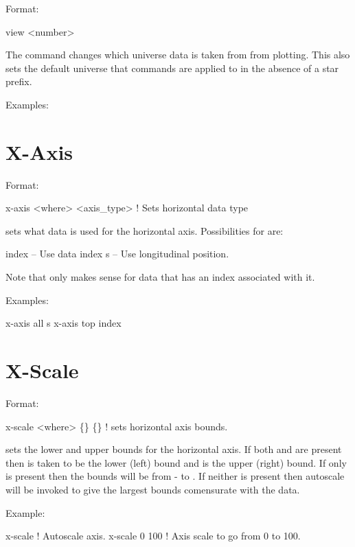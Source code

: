 Format:
\begin{example}
  view <number>
\end{example}

\vskip 0.2in 
The  command changes which universe data is taken from from
plotting.  This also sets the default universe that commands are
applied to in the absence of a star prefix.

Examples:

\section{X-Axis}
\label{s:x-axis}

Format:
\begin{example}
  x-axis <where> <axis_type> ! Sets horizontal data type
\end{example}

\vskip 0.2in 
 sets what data is used for the horizontal
axis. Possibilities for  are:
\begin{example}
  index    -- Use data index
  s        -- Use longitudinal position.
\end{example}
Note that  only makes sense for data that has an index
associated with it.

Examples:
\begin{example}
  x-axis all s
  x-axis top index
\end{example}

\section{X-Scale}
\label{s:x-scale}

Format:
\begin{example}
  x-scale <where> \{<bound1>\} \{<bound2>\}  ! sets horizontal axis bounds.
\end{example}

\vskip 0.2in 
 sets the lower and upper bounds for the horizontal axis.
If both  and  are present then 
is taken to be the lower (left) bound and  is the upper
(right) bound. If only  is present then the bounds will
be from - to . If neither is present then
autoscale will be invoked to give the largest bounds comensurate with
the data.

Example:
\begin{example}
  x-scale        ! Autoscale axis.
  x-scale 0 100  ! Axis scale to go from 0 to 100.
\end{example}

